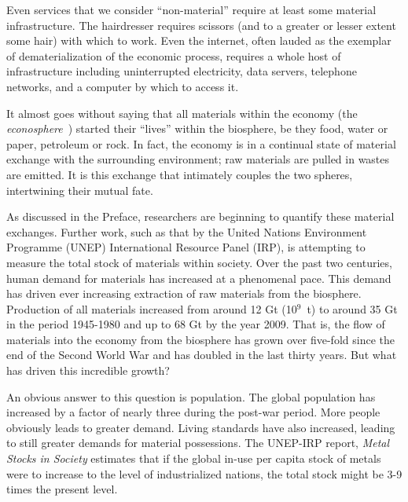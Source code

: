 Even services that we consider ``non-material'' require at least some material
infrastructure. The hairdresser requires scissors (and to a greater or lesser extent 
some hair) with which to work. 
Even the internet, 
often lauded as the exemplar of
dematerialization of the economic process, 
requires a whole host of
infrastructure including 
uninterrupted electricity, 
data servers, 
telephone networks, and 
a computer by which to access it.

It almost goes without saying that 
all materials within the economy (the \emph{econosphere}~\cite{Boulding1966})
started their ``lives'' within the biosphere,
be they food, water or paper, petroleum or rock. 
In fact,
the economy is in a continual state of material exchange
with the surrounding environment;
raw materials are pulled in wastes are emitted.
It is this exchange that intimately couples the two spheres,
intertwining their mutual fate.

As discussed in the Preface,
researchers are beginning to quantify these material exchanges.
Further work, such as that by 
the United Nations Environment Programme (UNEP)
International Resource Panel (IRP),
is attempting to measure 
the total stock of materials within society.\cite{Graedel2010}
Over the past two centuries,
human demand for materials has increased at a phenomenal pace.
This demand has driven ever increasing extraction of raw materials 
from the biosphere.
Production of all materials increased from
around 12 Gt (10$^9$~t) to 
around 35 Gt in the period 1945-1980 and up to
68 Gt by the year 2009.\cite{Krausmann2009}
That is, the flow of materials 
into the economy from the biosphere
has grown over five-fold
since the end of the Second World War
and has doubled in the last thirty years.
But what has driven this incredible growth?

An obvious answer to this question is population.
The global population has increased by a factor of 
nearly three during the post-war period.\cite{UNPD2013}
More people obviously leads to greater demand.
Living standards have also increased,
leading to still greater demands for material possessions.
The UNEP-IRP report,
\emph{Metal Stocks in Society} estimates that
if the global in-use per capita stock of metals were to
increase to the level of industrialized nations,
the total stock might be 3-9 times the present level.\cite{Graedel2010}

